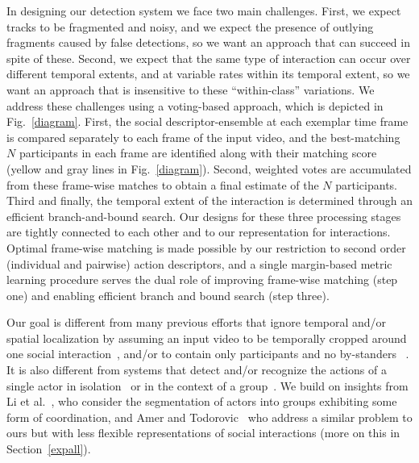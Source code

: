 In designing our detection system we face two main challenges. First, we expect tracks to be fragmented and noisy, and we expect the presence of outlying fragments caused by false detections, so we want an approach that can succeed in spite of these. Second, we expect that the same type of interaction can occur over different temporal extents, and at variable rates within its temporal extent, so we want an approach that is insensitive to these ``within-class'' variations. We address these challenges using a voting-based approach, which is depicted in Fig.~\ref{diagram}. First, the social descriptor-ensemble at each exemplar time frame is compared separately to each frame of the input video, and the best-matching $N$ participants in each frame are identified along with their matching score (yellow and gray lines in Fig.~\ref{diagram}). Second, weighted votes are accumulated from these frame-wise matches to obtain a final estimate of the $N$ participants. Third and finally, the temporal extent of the interaction is determined through an efficient branch-and-bound search. Our designs for these three processing stages are tightly connected to each other and to our representation for interactions. Optimal frame-wise matching is made possible by our restriction to second order (individual and pairwise) action descriptors, and a single margin-based metric learning procedure serves the dual role of improving frame-wise matching (step one) and enabling efficient branch and bound search (step three).

Our goal is different from many previous efforts that ignore temporal and/or spatial localization by assuming an input video to be temporally cropped around one social interaction~\cite{}, and/or to contain only participants and no by-standers~ \cite{Hongeng:act,Gong:act,Hakeem:act,McCowan:meeting,Ni:group,Choi:recogtrack,Intille:act,Vlad:group} . It is also different from systems that detect and/or recognize the actions of a single actor in isolation~\cite{Ke:detection,Yuan:detection,Shechtman:detection,Hu:detection,Laptev:detection,Duchenne:detection} or in the context of a group~\cite{Lan:retrieval}. We build on insights from Li et al.~\cite{Li:segmentation}, who consider the segmentation of actors into groups exhibiting some form of coordination, and Amer and Todorovic~\cite{Amer:group} who address a similar problem to ours but with less flexible representations of social interactions (more on this in Section~\ref{expall}). 

